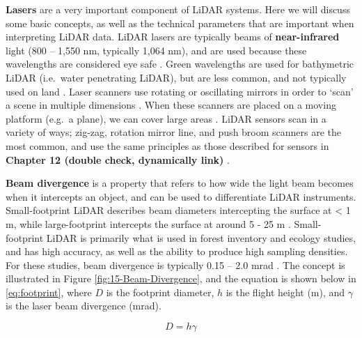 \documentclass[
]{book}
\begin{document}
\textbf{Lasers} are a very important component of LiDAR systems. Here we will discuss some basic concepts, as well as the technical parameters that are important when interpreting LiDAR data. LiDAR lasers are typically beams of \textbf{near-infrared} light (800 -- 1,550 nm, typically 1,064 nm), and are used because these wavelengths are considered eye safe \citep{white_best_2013}. Green wavelengths are used for bathymetric LiDAR (i.e.~water penetrating LiDAR), but are less common, and not typically used on land \citep{uf_geomatics_-_fort_lauderdale_lidar_2016-2}. Laser scanners use rotating or oscillating mirrors in order to `scan' a scene in multiple dimensions \citep{uf_geomatics_-_fort_lauderdale_lidar_2016-1}. When these scanners are placed on a moving platform (e.g.~a plane), we can cover large areas \citep{uf_geomatics_-_fort_lauderdale_lidar_2016-1}. LiDAR sensors scan in a variety of ways; zig-zag, rotation mirror line, and push broom scanners are the most common, and use the same principles as those described for sensors in \textbf{Chapter 12 (double check, dynamically link)} \citep{uf_geomatics_-_fort_lauderdale_lidar_2016-1}.

\textbf{Beam divergence} is a property that refers to how wide the light beam becomes when it intercepts an object, and can be used to differentiate LiDAR instruments. Small-footprint LiDAR describes beam diameters intercepting the surface at \textless{} 1 m, while large-footprint intercepts the surface at around 5 - 25 m \citep{lim_lidar_2003}. Small-footprint LiDAR is primarily what is used in forest inventory and ecology studies, and has high accuracy, as well as the ability to produce high sampling densities. For these studies, beam divergence is typically 0.15 -- 2.0 mrad \citep{white_best_2013}. The concept is illustrated in Figure \ref{fig:15-Beam-Divergence}, and the equation is shown below in \eqref{eq:footprint}, where \(D\) is the footprint diameter, \(h\) is the flight height (m), and \(\gamma\) is the laser beam divergence (mrad).

\begin{equation} 
  D = h \gamma
  \label{eq:footprint}
\end{equation}
\end{document}
